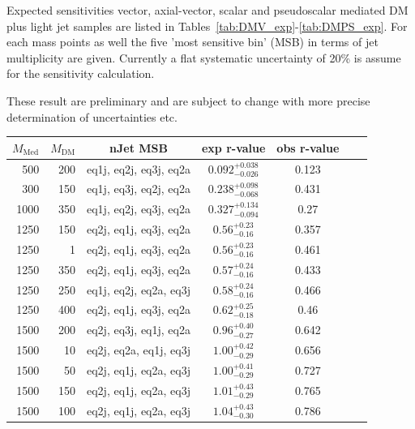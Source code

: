 \clearpage


Expected sensitivities vector, axial-vector, scalar and pseudoscalar mediated DM plus light jet samples are listed in Tables~\ref{tab:DMV_exp}-\ref{tab:DMPS_exp}. For each mass points as well the five 'most sensitive bin' (MSB) in terms of jet multiplicity are given. Currently a flat systematic uncertainty of 20\% is assume for the sensitivity calculation.

These result are preliminary and are subject to change with more precise determination of uncertainties etc.

\begin{table}
  \centering
  \begin{tabular}{rrccccc}
    \hline\hline
    $M_{\text{Med}}$ & $M_{\text{DM}}$ & nJet MSB & exp r-value & obs r-value \\
    \hline
      500 & 200 & eq1j, eq2j, eq3j, eq2a & $0.092_{-0.026}^{+0.038}$ & 0.123 \\
      300 & 150 & eq1j, eq3j, eq2j, eq2a & $0.238_{-0.068}^{+0.098}$ & 0.431 \\
     1000 & 350 & eq1j, eq2j, eq3j, eq2a & $0.327_{-0.094}^{+0.134}$ & 0.27 \\
     1250 & 150 & eq2j, eq1j, eq3j, eq2a & $0.56_{-0.16}^{+0.23}$    & 0.357 \\
     1250 &   1 & eq2j, eq1j, eq3j, eq2a & $0.56_{-0.16}^{+0.23}$    & 0.461 \\
     1250 & 350 & eq2j, eq1j, eq3j, eq2a & $0.57_{-0.16}^{+0.24}$    & 0.433 \\
     1250 & 250 & eq1j, eq2j, eq2a, eq3j & $0.58_{-0.16}^{+0.24}$    & 0.466 \\
     1250 & 400 & eq2j, eq1j, eq3j, eq2a & $0.62_{-0.18}^{+0.25}$    & 0.46 \\
     1500 & 200 & eq2j, eq3j, eq1j, eq2a & $0.96_{-0.27}^{+0.40}$    & 0.642 \\
     1500 &  10 & eq2j, eq2a, eq1j, eq3j & $1.00_{-0.29}^{+0.42}$    & 0.656 \\
     1500 &  50 & eq2j, eq1j, eq2a, eq3j & $1.00_{-0.29}^{+0.41}$    & 0.727 \\
     1500 & 150 & eq2j, eq1j, eq2a, eq3j & $1.01_{-0.29}^{+0.43}$    & 0.765 \\
     1500 & 100 & eq2j, eq1j, eq2a, eq3j & $1.04_{-0.30}^{+0.43}$    & 0.786 \\
    

\end{tabular}
\end{table}
